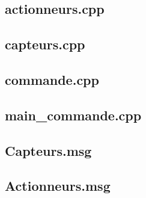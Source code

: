 \documentclass[a4paper,french, titlepage]{book}
\begin{document}
	\subsection{actionneurs.cpp}
	
	
	
	\subsection{capteurs.cpp}
	
	
	
	\subsection{commande.cpp}
	
	
	
	\subsection{main\_commande.cpp\label{annexe_packages_commande_main}}
	
	
	
	\subsection{Capteurs.msg}
	
	
	
	\subsection{Actionneurs.msg}
	
	

	
\end{document}
